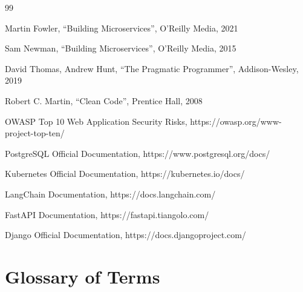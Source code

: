 \documentclass[12pt,a4paper]{report}
\begin{document}
\begin{thebibliography}{99}

 Martin Fowler, ``Building Microservices'', O'Reilly Media, 2021

 Sam Newman, ``Building Microservices'', O'Reilly Media, 2015

 David Thomas, Andrew Hunt, ``The Pragmatic Programmer'', Addison-Wesley, 2019

 Robert C. Martin, ``Clean Code'', Prentice Hall, 2008

 OWASP Top 10 Web Application Security Risks, https://owasp.org/www-project-top-ten/

 PostgreSQL Official Documentation, https://www.postgresql.org/docs/

 Kubernetes Official Documentation, https://kubernetes.io/docs/

 LangChain Documentation, https://docs.langchain.com/

 FastAPI Documentation, https://fastapi.tiangolo.com/

 Django Official Documentation, https://docs.djangoproject.com/

\end{thebibliography}


\newpage

\appendix

\chapter{Glossary of Terms}
\end{document}
